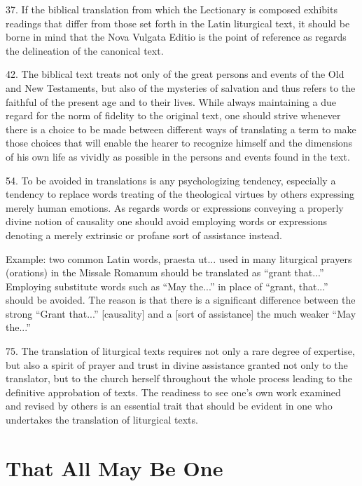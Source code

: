 \documentclass[oneside]{book}
\begin{document}
37. If the biblical translation from which the Lectionary is composed exhibits
readings that differ from those set forth in the Latin liturgical text, it
should be borne in mind that the Nova Vulgata Editio is the point of reference
as regards the delineation of the canonical text.

42. The biblical text treats not only of the great persons and events of the Old
and New Testaments, but also of the mysteries of salvation and thus refers to
the faithful of the present age and to their lives. While always maintaining a
due regard for the norm of fidelity to the original text, one should strive
whenever there is a choice to be made between different ways of translating a
term to make those choices that will enable the hearer to recognize himself and
the dimensions of his own life as vividly as possible in the persons and events
found in the text.

54. To be avoided in translations is any psychologizing tendency, especially a
tendency to replace words treating of the theological virtues by others
expressing merely human emotions. As regards words or expressions conveying a
properly divine notion of causality one should avoid employing words or
expressions denoting a merely extrinsic or profane sort of assistance instead.

Example: two common Latin words, praesta ut... used in many liturgical prayers
(orations) in the Missale Romanum should be translated as ``grant that...''
Employing substitute words such as ``May the...'' in place of ``grant, that...''
should be avoided. The reason is that there is a significant difference between
the strong ``Grant that...'' [causality] and a [sort of assistance] the much
weaker ``May the...''

75. The translation of liturgical texts requires not only a rare degree of
expertise, but also a spirit of prayer and trust in divine assistance granted
not only to the translator, but to the church herself throughout the whole
process leading to the definitive approbation of texts. The readiness to see
one's own work examined and revised by others is an essential trait that should
be evident in one who undertakes the translation of liturgical texts.


\chapter{That All May Be One}
\end{document}
